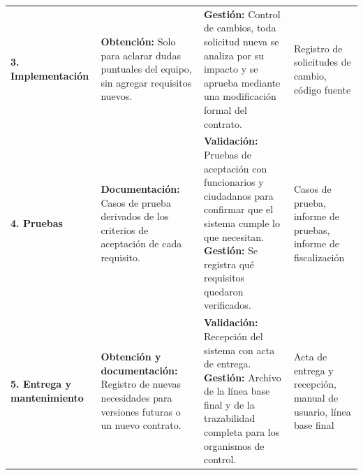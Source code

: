 {\begin{longtable}{@{}L{0.14\textwidth}L{0.36\textwidth}L{0.28\textwidth}L{0.18\textwidth}@{}}
\textbf{3. Implementación} & \textbf{Obtención:} Solo para aclarar dudas puntuales del equipo, sin agregar requisitos nuevos. & \textbf{Gestión:} Control de cambios, toda solicitud nueva se analiza por su impacto y se aprueba mediante una modificación formal del contrato. & Registro de solicitudes de cambio, código fuente\\
\textbf{4. Pruebas} & \textbf{Documentación:} Casos de prueba derivados de los criterios de aceptación de cada requisito. & \textbf{Validación:} Pruebas de aceptación con funcionarios y ciudadanos para confirmar que el sistema cumple lo que necesitan. \newline \textbf{Gestión:} Se registra qué requisitos quedaron verificados. & Casos de prueba, informe de pruebas, informe de fiscalización\\
\textbf{5. Entrega y mantenimiento} & \textbf{Obtención y documentación:} Registro de nuevas necesidades para versiones futuras o un nuevo contrato. & \textbf{Validación:} Recepción del sistema con acta de entrega. \newline \textbf{Gestión:} Archivo de la línea base final y de la trazabilidad completa para los organismos de control. & Acta de entrega y recepción, manual de usuario, línea base final\\
\end{longtable}
}
